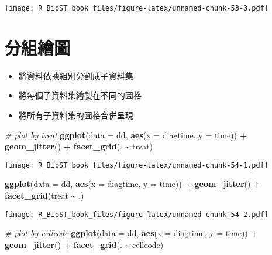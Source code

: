 \documentclass[
]{book}
\newenvironment{Shaded}{\begin{snugshade}}{\end{snugshade}}
\newcommand{\CommentTok}[1]{\textcolor[rgb]{0.56,0.35,0.01}{\textit{#1}}}
\newcommand{\DataTypeTok}[1]{\textcolor[rgb]{0.13,0.29,0.53}{#1}}
\newcommand{\KeywordTok}[1]{\textcolor[rgb]{0.13,0.29,0.53}{\textbf{#1}}}
\newcommand{\NormalTok}[1]{#1}
\newcommand{\OperatorTok}[1]{\textcolor[rgb]{0.81,0.36,0.00}{\textbf{#1}}}
\newcommand{\StringTok}[1]{\textcolor[rgb]{0.31,0.60,0.02}{#1}}
\providecommand{\tightlist}{%
  \setlength{\itemsep}{0pt}\setlength{\parskip}{0pt}}
\begin{document}
\texttt{[image: R\_BioST\_book\_files/figure-latex/unnamed-chunk-53-3.pdf]}

\hypertarget{ux5206ux7d44ux7e6aux5716}{%
\section{分組繪圖}\label{ux5206ux7d44ux7e6aux5716}}

\begin{itemize}
\tightlist
\item
  將資料依據組別分割成子資料集
\item
  將每個子資料集繪製在不同的圖格
\item
  將所有子資料集的圖格合併呈現
\end{itemize}

\begin{Shaded}
\begin{Highlighting}[]
\CommentTok{\# plot by treat}
\KeywordTok{ggplot}\NormalTok{(}\DataTypeTok{data =}\NormalTok{ dd, }\KeywordTok{aes}\NormalTok{(}\DataTypeTok{x =}\NormalTok{ diagtime, }\DataTypeTok{y =}\NormalTok{ time)) }\OperatorTok{+}\StringTok{ }\KeywordTok{geom\_jitter}\NormalTok{() }\OperatorTok{+}\StringTok{ }
\StringTok{  }\KeywordTok{facet\_grid}\NormalTok{(. }\OperatorTok{\textasciitilde{}}\StringTok{ }\NormalTok{treat)}
\end{Highlighting}
\end{Shaded}

\texttt{[image: R\_BioST\_book\_files/figure-latex/unnamed-chunk-54-1.pdf]}

\begin{Shaded}
\begin{Highlighting}[]
\KeywordTok{ggplot}\NormalTok{(}\DataTypeTok{data =}\NormalTok{ dd, }\KeywordTok{aes}\NormalTok{(}\DataTypeTok{x =}\NormalTok{ diagtime, }\DataTypeTok{y =}\NormalTok{ time)) }\OperatorTok{+}\StringTok{ }\KeywordTok{geom\_jitter}\NormalTok{() }\OperatorTok{+}\StringTok{ }
\StringTok{  }\KeywordTok{facet\_grid}\NormalTok{(treat }\OperatorTok{\textasciitilde{}}\StringTok{ }\NormalTok{.)}
\end{Highlighting}
\end{Shaded}

\texttt{[image: R\_BioST\_book\_files/figure-latex/unnamed-chunk-54-2.pdf]}

\begin{Shaded}
\begin{Highlighting}[]
\CommentTok{\# plot by cellcode}
\KeywordTok{ggplot}\NormalTok{(}\DataTypeTok{data =}\NormalTok{ dd, }\KeywordTok{aes}\NormalTok{(}\DataTypeTok{x =}\NormalTok{ diagtime, }\DataTypeTok{y =}\NormalTok{ time)) }\OperatorTok{+}\StringTok{ }\KeywordTok{geom\_jitter}\NormalTok{() }\OperatorTok{+}\StringTok{ }
\StringTok{  }\KeywordTok{facet\_grid}\NormalTok{(. }\OperatorTok{\textasciitilde{}}\StringTok{ }\NormalTok{cellcode)}
\end{Highlighting}
\end{Shaded}
\end{document}
